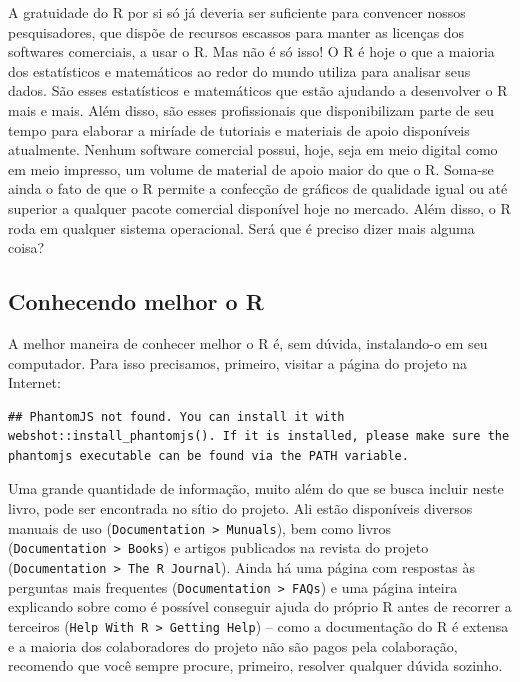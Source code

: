 \documentclass[]{book}
\begin{document}
A gratuidade do R por si só já deveria ser suficiente para convencer
nossos pesquisadores, que dispõe de recursos escassos para manter as
licenças dos softwares comerciais, a usar o R. Mas não é só isso! O R é
hoje o que a maioria dos estatísticos e matemáticos ao redor do mundo
utiliza para analisar seus dados. São esses estatísticos e matemáticos
que estão ajudando a desenvolver o R mais e mais. Além disso, são esses
profissionais que disponibilizam parte de seu tempo para elaborar a
miríade de tutoriais e materiais de apoio disponíveis atualmente. Nenhum
software comercial possui, hoje, seja em meio digital como em meio
impresso, um volume de material de apoio maior do que o R. Soma-se ainda
o fato de que o R permite a confecção de gráficos de qualidade igual ou
até superior a qualquer pacote comercial disponível hoje no mercado.
Além disso, o R roda em qualquer sistema operacional. Será que é preciso
dizer mais alguma coisa?

\subsection{Conhecendo melhor o R}\label{conhecendo-melhor-o-r}

A melhor maneira de conhecer melhor o R é, sem dúvida, instalando-o em
seu computador. Para isso precisamos, primeiro, visitar a página do
projeto na Internet:

\begin{verbatim}
## PhantomJS not found. You can install it with webshot::install_phantomjs(). If it is installed, please make sure the phantomjs executable can be found via the PATH variable.
\end{verbatim}

Uma grande quantidade de informação, muito além do que se busca incluir
neste livro, pode ser encontrada no sítio do projeto. Ali estão
disponíveis diversos manuais de uso
(\texttt{Documentation\ \textgreater{}\ Munuals}), bem como livros
(\texttt{Documentation\ \textgreater{}\ Books}) e artigos publicados na
revista do projeto
(\texttt{Documentation\ \textgreater{}\ The\ R\ Journal}). Ainda há uma
página com respostas às perguntas mais frequentes
(\texttt{Documentation\ \textgreater{}\ FAQs}) e uma página inteira
explicando sobre como é possível conseguir ajuda do próprio R antes de
recorrer a terceiros
(\texttt{Help\ With\ R\ \textgreater{}\ Getting\ Help}) -- como a
documentação do R é extensa e a maioria dos colaboradores do projeto não
são pagos pela colaboração, recomendo que você sempre procure, primeiro,
resolver qualquer dúvida sozinho.
\end{document}

